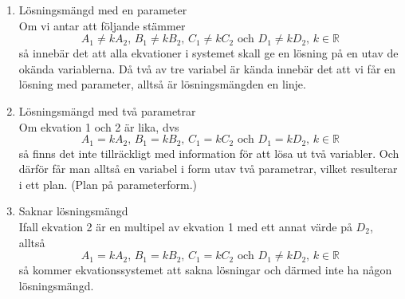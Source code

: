 \begin{enumerate}[label=Fall \arabic*:]
    \item  Lösningsmängd med en parameter\\
        Om vi antar att följande stämmer 
        \begin{equation*}
            A_{1} \neq kA_{2}\text{, }B_{1} \neq kB_{2}\text{, }C_{1} \neq kC_{2} \text{ och } D_{1} \neq kD_{2}\text{, }k\in\mathbb{R}
        \end{equation*}
        så innebär det att alla ekvationer i systemet skall ge en lösning på en utav de okända variablerna.
        Då två av tre variabel är kända innebär det att vi får en lösning med parameter, alltså är lösningsmängden en linje.
        \\
    \item  Lösningsmängd med två parametrar\\
        Om ekvation 1 och 2 är lika, dvs 
        \begin{equation*}
            A_{1} = kA_{2}\text{, }B_{1} = kB_{2}\text{, }C_{1} = kC_{2} \text{ och } D_{1} = kD_{2}\text{, }k\in\mathbb{R}
        \end{equation*}
        så finns det inte tillräckligt med information för att lösa ut två variabler.
        Och därför får man alltså en variabel i form utav två parametrar, vilket resulterar i ett plan. (Plan på parameterform.)
        \\
    \item Saknar lösningsmängd\\
        Ifall ekvation 2 är en multipel av ekvation 1 med ett annat värde på $D_{2}$, alltså
        \begin{equation*}
            A_{1} = kA_{2}\text{, }B_{1} = kB_{2}\text{, }C_{1} = kC_{2} \text{ och } D_{1} \neq kD_{2}\text{, }k\in\mathbb{R}
        \end{equation*}
        så kommer ekvationssystemet att sakna lösningar och därmed inte ha någon lösningsmängd.
\end{enumerate}